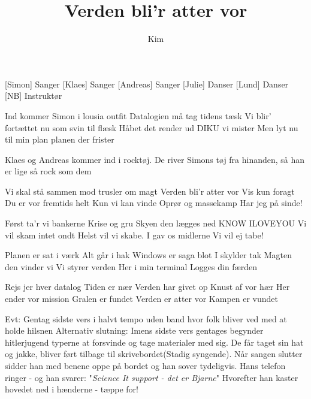 \documentclass[a4paper,11pt]{article}
\title{Verden bli'r atter vor}
\author{Kim}
\begin{document}
  \maketitle

  \begin{roles}
    [Simon] Sanger
    [Klaes] Sanger
    [Andreas] Sanger
    [Julie] Danser
    [Lund] Danser
    [NB] Instruktør
  \end{roles}

  \begin{song}
\scene Ind kommer Simon i lousia outfit
    	        Datalogien må 
		tag tidens tæsk
		Vi blir' fortættet nu
		som svin til flæsk
		Håbet det render ud	
		DIKU vi mister
		Men lyt nu til min plan	
		planen der frister

	\scene Klaes og Andreas kommer ind i rocktøj. De river Simons tøj fra hinanden, så han er lige så rock som dem

		Vi skal stå sammen mod
		trusler om magt
		Verden bli'r atter vor
		Vis kun foragt
		Du er vor fremtids helt
		Kun vi kan vinde
		Oprør og massekamp
		Har jeg på sinde!

		Først ta'r vi bankerne
		Krise og gru
		Skyen den lægges ned
		KNOW ILOVEYOU
		Vi vil skam intet ondt
		Helst vil vi skabe.
		I gav os midlerne
		Vi vil ej tabe!

		Planen er sat i værk
		Alt går i hak
		Windows er saga blot
		I skylder tak
		Magten den vinder vi
		Vi styrer verden
		Her i min terminal
		Logges din færden

		Rejs jer hver datalog
		Tiden er nær
		Verden har givet op
		Knust af vor hær
		Her ender vor mission
		Gralen er fundet
		Verden er atter vor 
		Kampen er vundet

		\scene Evt: Gentag sidste vers i halvt tempo uden band hvor folk bliver ved med at holde hilsnen
			\scene Alternativ slutning: Imens sidste vers gentages begynder hitlerjugend typerne at forsvinde og tage materialer med sig. De får taget sin hat og jakke, bliver ført tilbage til skrivebordet(Stadig syngende). Når sangen slutter sidder han med benene oppe på bordet og han sover tydeligvis. Hans telefon ringer - og han svarer: "\textit{Science It support - det er Bjarne}" Hvorefter han kaster hovedet ned i hænderne - tæppe for!

  \end{song}
\end{document}
